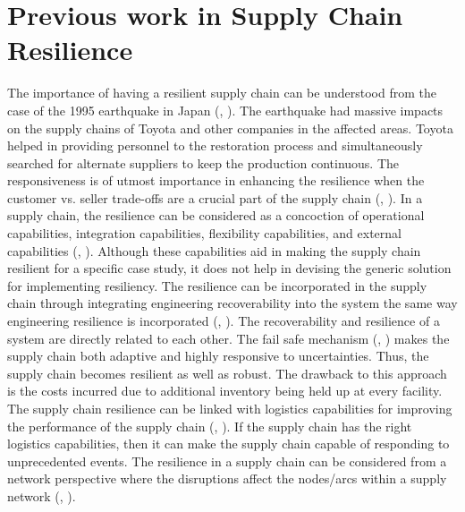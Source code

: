 \section{Previous work in Supply Chain Resilience}
The importance of having a resilient supply chain can be understood from the case of the 1995 earthquake in Japan (\citeauthor{Fujimoto2011}, \citeyear{Fujimoto2011}). The earthquake had massive impacts on the supply chains of Toyota and other companies in the affected areas. Toyota helped in providing personnel to the restoration process and simultaneously searched for alternate suppliers to keep the production continuous. The responsiveness is of utmost importance in enhancing the resilience when the customer vs. seller trade-offs are a crucial part of the supply chain (\citeauthor{saenz2018aligning}, \citeyear{saenz2018aligning}). In a supply chain, the resilience can be considered as a concoction of operational capabilities, integration capabilities, flexibility capabilities, and external capabilities (\citeauthor{brusset2017supply}, \citeyear{brusset2017supply}). Although these capabilities aid in making the supply chain resilient for a specific case study, it does not help in devising the generic solution for implementing resiliency. The resilience can be incorporated in the supply chain through integrating engineering recoverability into the system the same way engineering resilience is incorporated (\citeauthor{li2014engineering}, \citeyear{li2014engineering}). The recoverability and resilience of a system are directly related to each other. The fail safe mechanism (\citeauthor{Brandon-JonesE.;SquireB.;Autry2014}, \citeyear{Brandon-JonesE.;SquireB.;Autry2014}) makes the supply chain both adaptive and highly responsive to uncertainties. Thus, the supply chain becomes resilient as well as robust. The drawback to this approach is the costs incurred due to additional inventory being held up at every facility. The supply chain resilience can be linked with logistics capabilities for improving the performance of the supply chain (\citeauthor{ponomarov2009understanding}, \citeyear{ponomarov2009understanding}). If the supply chain has the right logistics capabilities, then it can make the supply chain capable of responding to unprecedented events. The resilience in a supply chain can be considered from a network perspective where the disruptions affect the nodes/arcs within a supply network (\citeauthor{Kim2015}, \citeyear{Kim2015}).  

